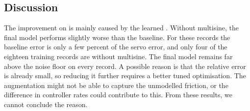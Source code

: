 \subsection{Discussion}\label{sec:discussion}
The improvement on  is mainly caused
by the learned  .
Without multisine, the final model performs slightly worse than the baseline.
For these records the baseline error is only a few percent of the servo error, 
and only four of the eighteen training records are 
without multisine.
The final model remains far above the noise floor on every record.
A possible reason is that the relative error is already small, 
so reducing it further requires a better tuned optimisation.
The augmentation might not be able to capture the unmodelled friction, or the 
difference in controller rates could contribute to this.
From these results, we cannot conclude the reason.

